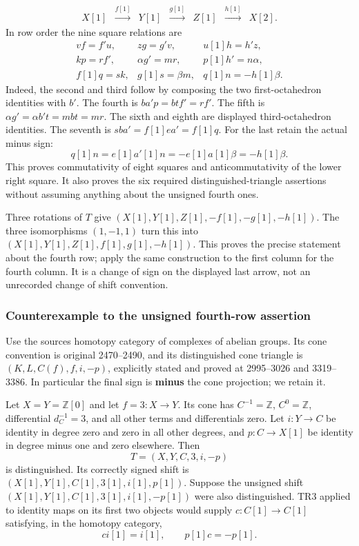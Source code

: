 \[\begin{array}{ccccccc}
X[1]&\xrightarrow{f[1]}&Y[1]&\xrightarrow{g[1]}&Z[1]&
 \xrightarrow{h[1]}&X[2].
\end{array}
\] In row order the nine square relations are \[
\begin{array}{lll}
vf=f'u,& zg=g'v,&u[1]h=h'z,\\
kp=rf',&\alpha g'=mr,&p[1]h'=n\alpha,\\
f[1]q=sk,&g[1]s=\beta m,&q[1]n=-h[1]\beta.
\end{array}
\] Indeed,\allowbreak{} the second and third follow by composing the two first-octahedron identities with \(b'\). The fourth is \(ba'p=btf'=rf'\). The fifth is \(\alpha g'=\alpha b't=mbt=mr\). The sixth and eighth are displayed third-octahedron identities. The seventh is \(sba'=f[1]ea'=f[1]q\). For the last retain the actual minus sign:\allowbreak{} \[
q[1]n=e[1]a'[1]n=-e[1]a[1]\beta=-h[1]\beta.
\] This proves commutativity of eight squares and anticommutativity of the lower right square. It also proves the six required distinguished-triangle assertions without assuming anything about the unsigned fourth ones.

Three rotations of \(T\) give \((X[1],Y[1],Z[1],-f[1],-g[1],-h[1])\). The three isomorphisms \((1,-1,1)\) turn this into \((X[1],Y[1],Z[1],f[1],g[1],-h[1])\). This proves the precise statement about the fourth row; apply the same construction to the first column for the fourth column. It is a change of sign on the displayed last arrow,\allowbreak{} not an unrecorded change of shift convention.

\subsubsection{Counterexample to the unsigned fourth-row assertion}\label{proofs-0001-1140-counterexample-to-the-unsigned-fourth-row-assertion}

Use the source\textquotesingle s homotopy category of complexes of abelian groups. Its cone convention is original 2470–\allowbreak{}2490,\allowbreak{} and its distinguished cone triangle is \((K,L,C(f),f,i,-p)\),\allowbreak{} explicitly stated and proved at 2995–\allowbreak{}3026 and 3319–\allowbreak{}3386. In particular the final sign is \textbf{minus} the cone projection; we retain it.

Let \(X=Y=\mathbb Z[0]\) and let \(f=3:X\to Y\). Its cone has \(C^{-1}=\mathbb Z\),\allowbreak{} \(C^0=\mathbb Z\),\allowbreak{} differential \(d_C^{-1}=3\),\allowbreak{} and all other terms and differentials zero. Let \(i:Y\to C\) be identity in degree zero and zero in all other degrees,\allowbreak{} and \(p:C\to X[1]\) be identity in degree minus one and zero elsewhere. Then \[
T=(X,Y,C,3,i,-p)
\] is distinguished. Its correctly signed shift is \((X[1],Y[1],C[1],3[1],i[1],p[1])\). Suppose the unsigned shift \((X[1],Y[1],C[1],3[1],i[1],-p[1])\) were also distinguished. TR3 applied to identity maps on its first two objects would supply \(c:C[1]\to C[1]\) satisfying,\allowbreak{} in the homotopy category,\allowbreak{} \[
ci[1]=i[1],\qquad p[1]c=-p[1].
\]

